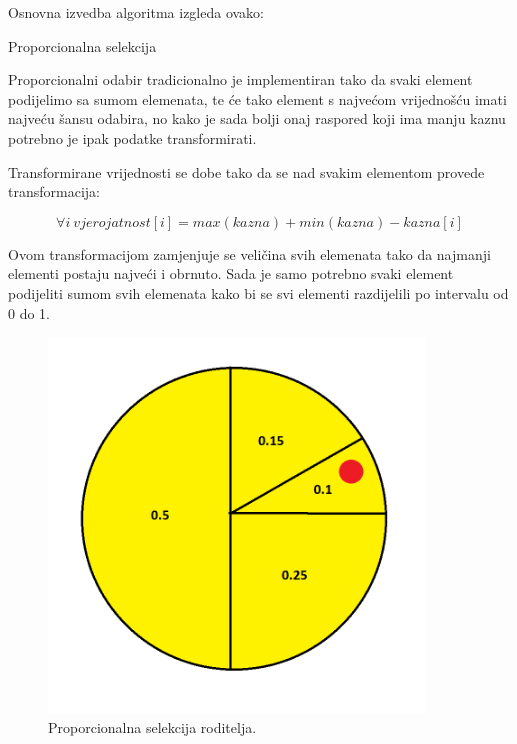 \documentclass[times, utf8, zavrsni]{fer}
\begin{document}
Osnovna izvedba algoritma izgleda ovako:
\newpage
\begin{algorithm}
\caption{Proporcionalna selekcija}
\label{algo:proporcionalno}
\begin{algorithmic}
\STATE{}
\ENDFOR
{}
\ENDFOR
\STATE{}
\ENDIF
\ENDFOR
\end{algorithmic}
\end{algorithm}

Proporcionalni odabir tradicionalno je implementiran tako da svaki element podijelimo sa sumom elemenata, te će tako element s najvećom vrijednošću imati najveću šansu odabira, no kako je sada bolji onaj raspored koji ima manju kaznu potrebno je ipak podatke transformirati.

Transformirane vrijednosti se dobe tako da se nad svakim elementom provede transformacija:

\begin{equation}
\forall i\ vjerojatnost[i] = max(kazna) + min(kazna) - kazna[i]
\label{eq:trans-kazne}
\end{equation}

Ovom transformacijom zamjenjuje se veličina svih elemenata tako da najmanji elementi postaju najveći i obrnuto. Sada je samo potrebno svaki element podijeliti sumom svih elemenata kako bi se svi elementi razdijelili po intervalu od 0 do 1.

\begin{figure}[htb]
\centering
\includegraphics[width=10cm]{images/rulet.png}
\caption{Proporcionalna selekcija roditelja.}
\label{fig:rulet}
\end{figure}
\end{document}
